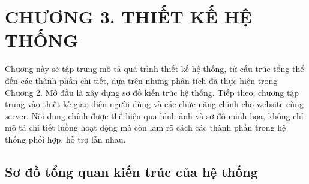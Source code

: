 
\section*{CHƯƠNG 3. THIẾT KẾ HỆ THỐNG}
\setcounter{section}{3}
\setcounter{subsection}{0} %
\setcounter{table}{0} %
\setcounter{figure}{0} %

Chương này sẽ tập trung mô tả quá trình thiết kế hệ thống, từ cấu trúc tổng thể đến các thành phần chi tiết, dựa trên những phân tích đã thực hiện trong Chương 2.
Mở đầu là xây dựng sơ đồ kiến trúc hệ thống.
Tiếp theo, chương tập trung vào thiết kế giao diện người dùng và các chức năng chính cho website cùng server.
Nội dung chính được thể hiện qua hình ảnh và sơ đồ minh họa, không chỉ mô tả chi tiết luồng hoạt động mà còn làm rõ cách các thành phần trong hệ thống phối hợp, hỗ trợ lẫn nhau.
\subsection{Sơ đồ tổng quan kiến trúc của hệ thống}

